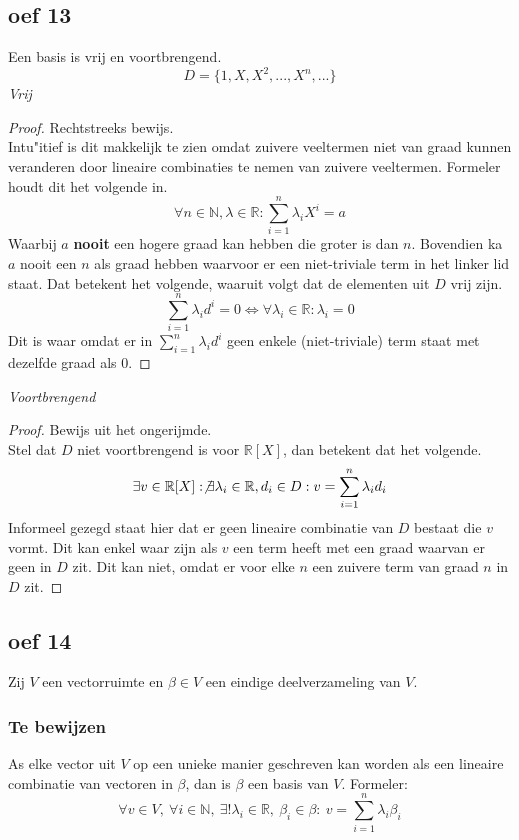 \documentclass[lineaire_algebra_oplossingen.tex]{subfiles}
\begin{document}
\subsection{oef 13}
Een basis is vrij en voortbrengend.
\[
D = \{1,X,X^2,...,X^n,...\}
\]
\emph{Vrij}
\begin{proof}
Rechtstreeks bewijs.\\
Intu"itief is dit makkelijk te zien omdat zuivere veeltermen niet van graad kunnen veranderen door lineaire combinaties te nemen van zuivere veeltermen. Formeler houdt dit het volgende in.
\[
\forall n\in \mathbb{N},\lambda \in \mathbb{R}: \sum_{i=1}^n\lambda_iX^i = a
\] 
Waarbij $a$ \textbf{nooit} een hogere graad kan hebben die groter is dan $n$. Bovendien ka $a$ nooit een $n$ als graad hebben waarvoor er een niet-triviale term in het linker lid staat.
Dat betekent het volgende, waaruit volgt dat de elementen uit $D$ vrij zijn.
\[
\sum_{i=1}^n\lambda_id^i = 0 \Leftrightarrow \forall \lambda_i \in \mathbb{R}: \lambda_i =0
\]
Dit is waar omdat er in $\sum_{i=1}^n\lambda_id^i$ geen enkele (niet-triviale) term staat met dezelfde graad als $0$.
\end{proof}
\emph{Voortbrengend}\\
\begin{proof}
Bewijs uit het ongerijmde.\\
Stel dat $D$ niet voortbrengend is voor $\mathbb{R}[X]$, dan betekent dat het volgende.
\[
\exists v \in \mathbb{R}[X]: \not\exists \lambda_i\in \mathbb{R},d_i \in D: v = \sum_{i=1}^n\lambda_id_i
\]
Informeel gezegd staat hier dat er geen lineaire combinatie van $D$ bestaat die $v$ vormt.
Dit kan enkel waar zijn als $v$ een term heeft met een graad waarvan er geen in $D$ zit. Dit kan niet, omdat er voor elke $n$ een zuivere term van graad $n$ in $D$ zit.
\end{proof}

\subsection{oef 14}
Zij $V$ een vectorruimte en $\beta \in V$ een eindige deelverzameling van $V$.
\subsubsection*{Te bewijzen}
As elke vector uit $V$ op een unieke manier geschreven kan worden als een lineaire combinatie van vectoren in $\beta$, dan is $\beta$ een basis van $V$.
Formeler:
\[
\forall v \in V,\ \forall i\in \mathbb{N},\ \exists!\lambda_i\in \mathbb{R},\ \beta_i \in \beta:\ v=\sum_{i = 1}^n\lambda_i\beta_i
\]
\end{document}
